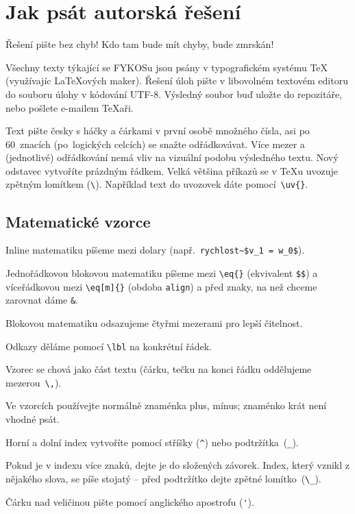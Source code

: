 \documentclass[fykos]{fksbase} %
\begin{document}
\section{Jak psát autorská řešení}

Řešení pište bez chyb! Kdo tam bude mít chyby, bude zmrskán!

Všechny texty týkající se FYKOSu jsou psány v typografickém systému \TeX
(využívajíc {\LaTeX}ových maker). Řešení úloh pište v libovolném
textovém editoru do souboru úlohy v kódování UTF-8. Výsledný soubor buď uložte
do repozitáře, nebo pošlete e-mailem TeXaři.

Text pište česky s háčky a čárkami v první osobě množného čísla, asi po 60~znacích
(po~logických celcích) se snažte odřádkovávat. Více mezer a (jednotlivé) odřádkování
nemá vliv na vizuální podobu výsledného textu. Nový odstavec vytvoříte prázdným
řádkem. Velká většina příkazů
se v TeXu uvozuje zpětným lomítkem (\verb|\|). Například text do uvozovek dáte
pomocí~\verb|\uv{}|.

\subsection{Matematické vzorce}
\begin{compactitem}
    \item Inline matematiku píšeme mezi dolary (např.~\verb|rychlost~$v_1 = w_0$|).
    \item Jednořádkovou blokovou matematiku píšeme mezi \verb|\eq{}| (ekvivalent \verb|$$|)
    a víceřádkovou mezi \verb|\eq[m]{}| (obdoba \verb|align|) a před znaky, na než chceme
    zarovnat dáme \verb|&|.
    \item Blokovou matematiku odsazujeme čtyřmi mezerami pro lepší čitelnost.
    \item Odkazy děláme pomocí \verb|\lbl| na konkrétní řádek.
    \item Vzorec se chová jako část textu (čárku, tečku na konci řádku oddělujeme mezerou~\verb|\,|).
    \item Ve vzorcích používejte normálně znaménka plus, mínus; znaménko krát není vhodné psát.
    \item Horní a dolní index vytvoříte pomocí stříšky (\verb|^|) nebo podtržítka~(\verb|_|).
    \item Pokud je v indexu více znaků, dejte je do složených závorek. Index, který
    vznikl z nějakého slova, se píše stojatý – před podtržítko dejte zpětné lomítko~(\verb|\_|).
    \item Čárku nad veličinou pište pomocí anglického apostrofu (\verb|'|).
\end{compactitem}
\end{document}
